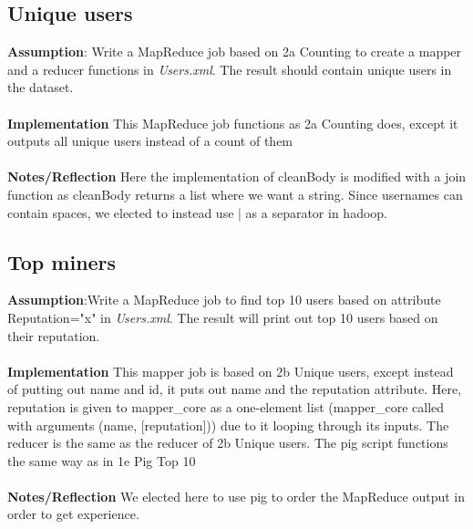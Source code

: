 \documentclass[fleqn,10pt]{wlscirep}
\begin{document}
\subsection{Unique users}
\textbf{Assumption}: Write a MapReduce job based on 2a Counting to create a mapper  and a reducer functions in \textit{Users.xml}. The result should contain unique users in the dataset.  \\ \\
\textbf{Implementation} This MapReduce job functions as 2a Counting does, except it outputs all unique users instead of a count of them \\ \\
\textbf{Notes/Reflection} Here the implementation of cleanBody is modified with a join function as cleanBody returns a list where we want a string. Since usernames can contain spaces, we elected to instead use | as a separator in hadoop.
 

\subsection{Top miners}
\textbf{Assumption}:Write a MapReduce job to find top 10 users based on attribute Reputation="x" in \textit{Users.xml}. The result will print out top 10 users based on their reputation. \\ \\
\textbf{Implementation} This mapper job is based on 2b Unique users, except instead of putting out name and id, it puts out name and the reputation attribute. Here, reputation is given to mapper\_core as a one-element list (mapper\_core called with arguments (name, [reputation])) due to it looping through its inputs. The reducer is the same as the reducer of 2b Unique users. The pig script functions the same way as in 1e Pig Top 10\\ \\
\textbf{Notes/Reflection} We elected here to use pig to order the MapReduce output in order to get experience.

\end{document}
